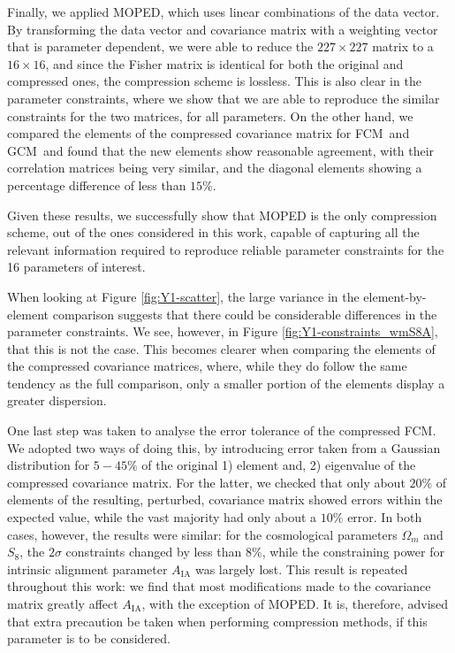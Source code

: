\documentclass[twocolumn]{\docclass}
\newcommand{\rf}[1]{Figure \ref{fig:#1}}
\newcommand\full{FCM}
\newcommand\gaussian{GCM}
\begin{document}
	Finally, we applied MOPED, which uses linear combinations of the data vector. By transforming the data vector and covariance matrix with a weighting vector that is parameter dependent, we were able to reduce the $227 \times 227$ matrix to a $16 \times 16$, and since the Fisher matrix is identical for both the original and compressed ones, the compression scheme is lossless. This is also clear in the parameter constraints, where we show that we are able to reproduce the similar constraints for the two matrices, for all parameters. On the other hand, we compared the elements of the compressed covariance matrix for \full\ and \gaussian\ and found that the new elements show reasonable agreement, with their correlation matrices being very similar, and the diagonal elements showing a percentage difference of less than $15\%$.
	
	Given these results, we successfully show that MOPED is the only compression scheme, out of the ones considered in this work, capable of capturing all the relevant information required to reproduce reliable parameter constraints for the 16 parameters of interest.
	
	When looking at \rf{Y1-scatter}, the large variance in the element-by-element comparison suggests that there could be considerable differences in the parameter constraints. We see, however, in \rf{Y1-constraints_wmS8A}, that this is not the case. This becomes clearer when comparing the elements of the compressed covariance matrices, where, while they do follow the same tendency as the full comparison, only a smaller portion of the elements display a greater dispersion.
	
	One last step was taken to analyse the error tolerance of the compressed \full. We adopted two ways of doing this, by introducing error taken from a Gaussian distribution for $5 - 45 \%$ of the original 1) element and, 2) eigenvalue of the compressed covariance matrix. For the latter, we checked that only about $20 \%$ of elements of the resulting, perturbed, covariance matrix showed errors within the expected value, while the vast majority had only about a $10\%$ error. In both cases, however, the results were similar: for the cosmological parameters $\Omega_m$ and $S_8$, the $2\sigma$ constraints changed by less than $8\%$, while the constraining power for intrinsic alignment parameter $A_{\mathrm{IA}}$ was largely lost. This result is repeated throughout this work: we find that most modifications made to the covariance matrix greatly affect $A_{\mathrm{IA}}$, with the exception of MOPED. It is, therefore, advised that extra precaution be taken when performing compression methods, if this parameter is to be considered.
	
\end{document}
